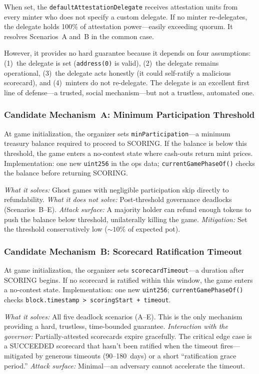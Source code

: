 \documentclass[11pt,a4paper]{article}
\begin{document}
When set, the \texttt{defaultAttestationDelegate} receives attestation units from every minter who does not specify a custom delegate. If no minter re-delegates, the delegate holds 100\% of attestation power---easily exceeding quorum. It resolves Scenarios~A and~B in the common case.

However, it provides no hard guarantee because it depends on four assumptions: (1)~the delegate is set (\texttt{address(0)} is valid), (2)~the delegate remains operational, (3)~the delegate acts honestly (it could self-ratify a malicious scorecard), and (4)~minters do not re-delegate. The delegate is an excellent first line of defense---a trusted, social mechanism---but not a trustless, automated one.

\subsubsection{Candidate Mechanism~A: Minimum Participation Threshold}

At game initialization, the organizer sets \texttt{minParticipation}---a minimum treasury balance required to proceed to SCORING. If the balance is below this threshold, the game enters a no-contest state where cash-outs return mint prices. Implementation: one new \texttt{uint256} in the ops data; \texttt{currentGamePhaseOf()} checks the balance before returning SCORING.

\emph{What it solves:} Ghost games with negligible participation skip directly to refundability. \emph{What it does not solve:} Post-threshold governance deadlocks (Scenarios~B--E). \emph{Attack surface:} A majority holder can refund enough tokens to push the balance below threshold, unilaterally killing the game. \emph{Mitigation:} Set the threshold conservatively low (${\sim}10\%$ of expected pot).

\subsubsection{Candidate Mechanism~B: Scorecard Ratification Timeout}

At game initialization, the organizer sets \texttt{scorecardTimeout}---a duration after SCORING begins. If no scorecard is ratified within this window, the game enters a no-contest state. Implementation: one new \texttt{uint256}; \texttt{currentGamePhaseOf()} checks \texttt{block.timestamp > scoringStart + timeout}.

\emph{What it solves:} All five deadlock scenarios (A--E). This is the only mechanism providing a hard, trustless, time-bounded guarantee. \emph{Interaction with the governor:} Partially-attested scorecards expire gracefully. The critical edge case is a SUCCEEDED scorecard that hasn't been ratified when the timeout fires---mitigated by generous timeouts (90--180~days) or a short ``ratification grace period.'' \emph{Attack surface:} Minimal---an adversary cannot accelerate the timeout.
\end{document}

